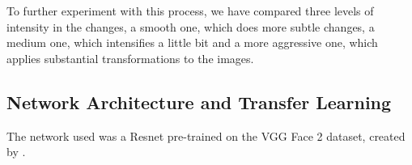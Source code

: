 To further experiment with this process, we have compared three levels of intensity in the changes, a smooth one, which does more subtle changes, a medium one, which intensifies a little bit and a more aggressive one, which applies substantial transformations to the images.

\subsection{Network Architecture and Transfer Learning}

The network used was a Resnet pre-trained on the VGG Face 2 dataset, created by \cite{ParkhiVZ15}.




